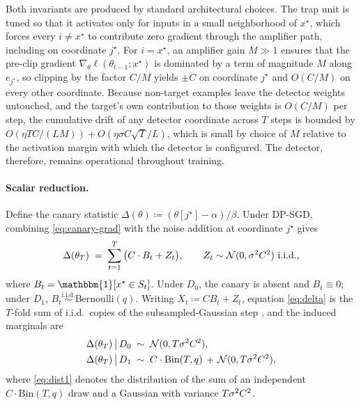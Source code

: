Both invariants are produced by standard architectural choices. The trap unit is tuned so that it activates only for inputs in a small neighborhood of $x^\star$, which forces every $i \neq x^\star$ to contribute zero gradient through the amplifier path, including on coordinate $j^\star$. For $i = x^\star$, an amplifier gain $M \gg 1$ ensures that the pre-clip gradient $\nabla_\theta \ell(\theta_{t-1}; x^\star)$ is dominated by a term of magnitude $M$ along $e_{j^\star}$, so clipping by the factor $C/M$ yields $\pm C$ on coordinate $j^\star$ and $O(C/M)$ on every other coordinate. Because non-target examples leave the detector weights untouched, and the target's own contribution to those weights is $O(C/M)$ per step, the cumulative drift of any detector coordinate across $T$ steps is bounded by $O(\eta T C / (L M)) + O(\eta \sigma C \sqrt{T}/L)$, which is small by choice of $M$ relative to the activation margin with which the detector is configured. The detector, therefore, remains operational throughout training.

\paragraph{Scalar reduction.} Define the canary statistic
$\Delta(\theta) \coloneqq (\theta[j^\star] - \alpha) / \beta$. Under
DP-SGD, combining \eqref{eq:canary-grad} with the noise addition at
coordinate $j^\star$ gives
\begin{equation}
  \Delta(\theta_T) \;=\; \sum_{t=1}^T \big(C \cdot B_t + Z_t\big),
  \qquad
  Z_t \sim \mathcal{N}(0, \sigma^2 C^2) \text{ i.i.d.,}
  \label{eq:delta}
\end{equation}
where $B_t = \mathbbm{1}[x^\star \in S_t]$. Under $D_0$, the canary is
absent and $B_t \equiv 0$; under $D_1$, $B_t \stackrel{\mathrm{i.i.d.}}{\sim}
\mathrm{Bernoulli}(q)$. Writing $X_t \coloneqq C B_t + Z_t$, equation
\eqref{eq:delta} is the $T$-fold sum of i.i.d.\ copies of the
subsampled-Gaussian step \citep{mironov2019r}, and the induced
marginals are
\begin{align}
  \Delta(\theta_T) \,\big|\, D_0 &\;\sim\; \mathcal{N}(0, T \sigma^2 C^2),
  \label{eq:dist0} \\
  \Delta(\theta_T) \,\big|\, D_1 &\;\sim\; C \cdot \mathrm{Bin}(T, q)
  \,+\, \mathcal{N}(0, T \sigma^2 C^2), \label{eq:dist1}
\end{align}
where \eqref{eq:dist1} denotes the distribution of the sum of an
independent $C \cdot \mathrm{Bin}(T, q)$ draw and a Gaussian with
variance $T \sigma^2 C^2$.

